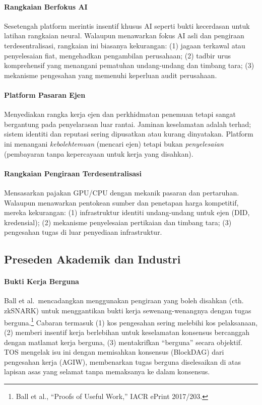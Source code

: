 \documentclass[11pt]{article}
\begin{document}
\paragraph{Rangkaian Berfokus AI} Sesetengah platform merintis insentif khusus AI seperti bukti kecerdasan untuk latihan rangkaian neural. Walaupun menawarkan fokus AI asli dan pengiraan terdesentralisasi, rangkaian ini biasanya kekurangan: (1) jagaan terkawal atau penyelesaian fiat, mengehadkan pengambilan perusahaan; (2) tadbir urus komprehensif yang menangani pematuhan undang-undang dan timbang tara; (3) mekanisme pengesahan yang memenuhi keperluan audit perusahaan.

\paragraph{Platform Pasaran Ejen} Menyediakan rangka kerja ejen dan perkhidmatan penemuan tetapi sangat bergantung pada penyelarasan luar rantai. Jaminan keselamatan adalah terhad; sistem identiti dan reputasi sering dipusatkan atau kurang dinyatakan. Platform ini menangani \emph{kebolehtemuan} (mencari ejen) tetapi bukan \emph{penyelesaian} (pembayaran tanpa kepercayaan untuk kerja yang disahkan).

\paragraph{Rangkaian Pengiraan Terdesentralisasi} Mensasarkan pajakan GPU/CPU dengan mekanik pasaran dan pertaruhan. Walaupun menawarkan pentokean sumber dan penetapan harga kompetitif, mereka kekurangan: (1) infrastruktur identiti undang-undang untuk ejen (DID, kredensial); (2) mekanisme penyelesaian pertikaian dan timbang tara; (3) pengesahan tugas di luar penyediaan infrastruktur.

\subsection{Preseden Akademik dan Industri}
\paragraph{Bukti Kerja Berguna} Ball et al.\ mencadangkan menggunakan pengiraan yang boleh disahkan (cth. zkSNARK) untuk menggantikan bukti kerja sewenang-wenangnya dengan tugas berguna.\footnote{Ball et al., ``Proofs of Useful Work,'' IACR ePrint 2017/203.} Cabaran termasuk (1) kos pengesahan sering melebihi kos pelaksanaan, (2) memberi insentif kerja berlebihan untuk keselamatan konsensus bercanggah dengan matlamat kerja berguna, (3) mentakrifkan ``berguna'' secara objektif. TOS mengelak isu ini dengan memisahkan konsensus (BlockDAG) dari pengesahan kerja (AGIW), membenarkan tugas berguna diselesaikan di atas lapisan asas yang selamat tanpa memaksanya ke dalam konsensus.
\end{document}

